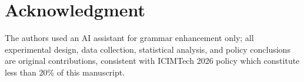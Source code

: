 ﻿\documentclass[conference]{IEEEtran}
\begin{document}
\section*{Acknowledgment}

The authors used an AI assistant for grammar enhancement only; all experimental design, data collection, statistical analysis, and policy conclusions are original contributions, consistent with ICIMTech 2026 policy which constitute less than 20\% of this manuscript.

\end{document}
